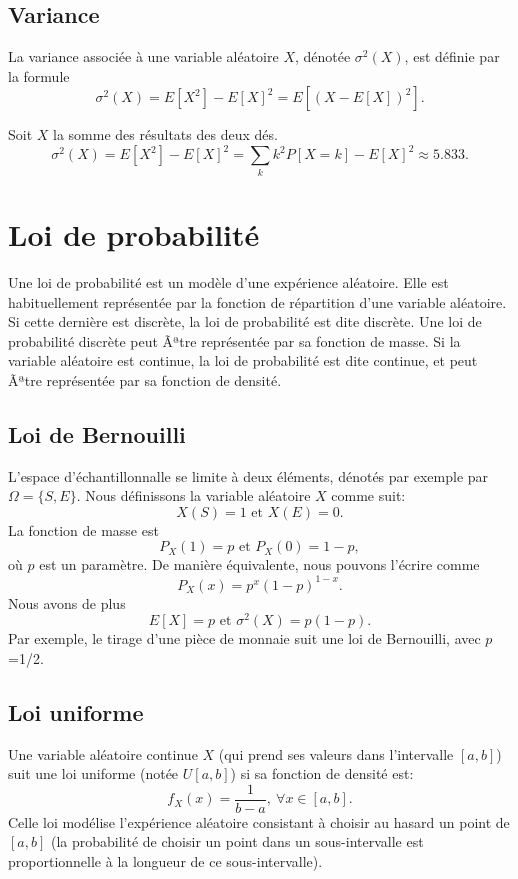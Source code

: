 \subsection{Variance}

La variance associée à une variable aléatoire $X$, dénotée  $\sigma^2(X)$, est définie par la formule
\[
\sigma^2(X) = E[X^2]-E[X]^2 = E[(X-E[X])^2].
\]

\begin{example}
Soit $X$ la somme des résultats des deux dés.
\[
\sigma^2(X) = E[X^2] - E[X]^2 = \sum_k k^2 P[X=k] - E[X]^2 \approx 5.833.
\]
\end{example}

\section{Loi de probabilité}

Une loi de probabilité est un modèle d'une expérience aléatoire.
Elle est habituellement représentée par la fonction de répartition d'une variable aléatoire.
Si cette dernière est discrète, la loi de probabilité est dite discrète.
 Une loi de probabilité discrète peut Ãªtre représentée par sa fonction de masse.
 Si la variable aléatoire est continue, la loi de probabilité est dite continue, et peut
 Ãªtre représentée par sa fonction de densité.

\subsection{Loi de Bernouilli}

L'espace d'échantillonnalle se limite à deux éléments, dénotés par exemple par $\Omega = \lbrace S, E \rbrace$.
Nous définissons la variable aléatoire $X$  comme suit:
\[
 X(S)=1\mbox{ et }X(E)=0.
\]
La fonction de masse est
\[
 P_X(1)=p\mbox{ et }P_X(0)=1-p,
 \]
 où $p$ est un paramètre. De manière équivalente, nous pouvons l'écrire comme
 \[
 P_X(x)=p^x(1-p)^{1-x}.
 \]
 Nous avons de plus
 \[
 E[X] = p\mbox{ et }\sigma^2(X) = p(1-p).
\]
Par exemple, le tirage d'une pièce de monnaie suit une loi de Bernouilli, avec $p$=1/2.

\subsection{Loi uniforme}

Une variable aléatoire continue $X$ (qui prend ses valeurs dans l'intervalle $[a,b]$) suit une loi uniforme (notée $U[a,b]$) si sa fonction de densité est:
\[
 f_X(x) = \frac{1}{b - a},\ \forall x \in [a,b].
 \]
 Celle loi modélise l'expérience aléatoire consistant à choisir au hasard un point de $[a,b]$
 (la probabilité de choisir un point dans un sous-intervalle est proportionnelle à la longueur de ce sous-intervalle).
 
